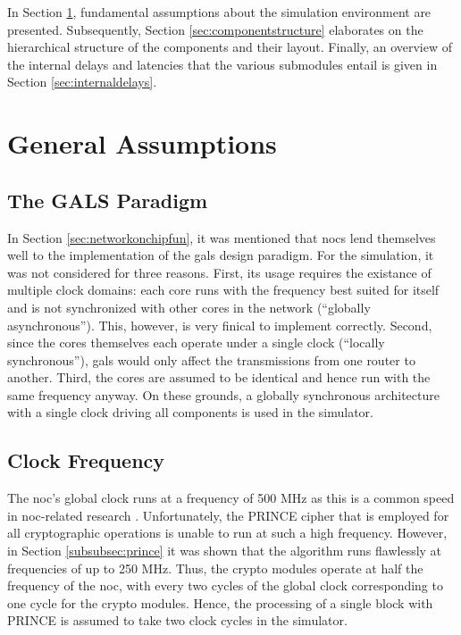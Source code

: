 In Section \ref{sec:generalass}, fundamental assumptions about the simulation environment are presented. Subsequently, Section
\ref{sec:componentstructure} elaborates on the hierarchical structure of the components and their layout. Finally, an overview of the internal delays
and latencies that the various submodules entail is given in Section \ref{sec:internaldelays}.

\section{General Assumptions}\label{sec:generalass}
\subsection{The GALS Paradigm}
In Section \ref{sec:networkonchipfun}, it was mentioned that \glspl{noc} lend themselves well to the implementation of the \gls{gals} design paradigm.
For the simulation, it was not considered for three reasons. First, its usage requires the existance of multiple clock domains: each core runs with the
frequency best suited for itself and is not synchronized with other cores in the network (\enquote{globally asynchronous}). This, however, is very
finical to implement correctly. Second, since the cores themselves each operate under a single clock (\enquote{locally synchronous}), \gls{gals} would
only affect the transmissions from one router to another. Third, the cores are assumed to be identical and hence run with the same frequency anyway.
On these grounds, a globally synchronous architecture with a single clock driving all components is used in the simulator.

\subsection{Clock Frequency}\label{subsec:clockfrequency}
The \gls{noc}'s global clock runs at a frequency of 500 MHz as this is a common speed in \gls{noc}-related research
\cites{frey15stateobfuscation}{frey17hardenednoc}. Unfortunately, the PRINCE cipher that is employed for all cryptographic operations is unable to run at
such a high frequency. However, in Section \ref{subsubsec:prince} it was shown that the algorithm runs flawlessly at frequencies of up to 250 MHz.
Thus, the crypto modules operate at half the frequency of the \gls{noc}, with every two cycles of the global clock corresponding to one
cycle for the crypto modules. Hence, the processing of a single block with PRINCE is assumed to take two clock cycles in the simulator.

